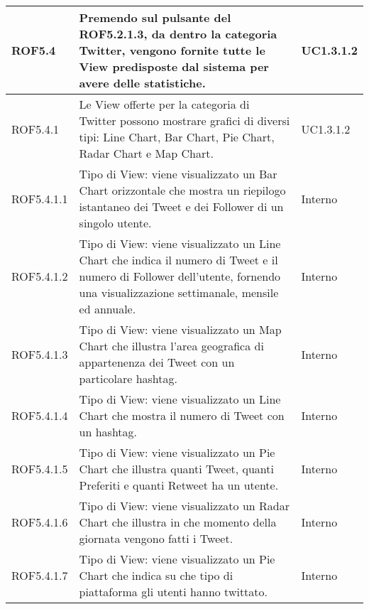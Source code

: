 \begin{center}
\begin{longtable}{| p{2.5cm} | p{8cm} | p{2cm} |}
		ROF5.4  &  Premendo sul pulsante del ROF5.2.1.3, da dentro la categoria Twitter, vengono fornite tutte le View predisposte dal sistema per avere delle statistiche. &  UC1.3.1.2  \\
		\hline
		ROF5.4.1  & Le View offerte per la categoria di Twitter possono mostrare grafici di diversi tipi: Line Chart, Bar Chart, Pie Chart, Radar Chart e Map Chart.  &  UC1.3.1.2  \\
		\hline
		ROF5.4.1.1  &  Tipo di View: viene visualizzato un Bar Chart orizzontale che mostra un riepilogo istantaneo dei Tweet e dei Follower di un singolo utente. & Interno \\
		\hline
		ROF5.4.1.2  &  Tipo di View: viene visualizzato un Line Chart che indica il numero di Tweet e il numero di Follower dell'utente, fornendo una visualizzazione settimanale, mensile ed annuale. & Interno \\
		\hline
		ROF5.4.1.3  &  Tipo di View: viene visualizzato un Map Chart che illustra l'area geografica di appartenenza dei Tweet con un particolare hashtag. & Interno \\
		\hline
		ROF5.4.1.4  &  Tipo di View: viene visualizzato un Line Chart che mostra il numero di Tweet con un hashtag.  & Interno \\
		\hline
		ROF5.4.1.5  &  Tipo di View: viene visualizzato un Pie Chart che illustra quanti Tweet, quanti Preferiti e quanti Retweet ha un utente. & Interno \\
		\hline
		ROF5.4.1.6  &  Tipo di View: viene visualizzato un Radar Chart che illustra in che momento della giornata vengono fatti i Tweet. & Interno \\
		\hline
		ROF5.4.1.7  &  Tipo di View: viene visualizzato un Pie Chart che indica su che tipo di piattaforma gli utenti hanno twittato. & Interno \\
		\hline



\end{longtable}
\end{center}
